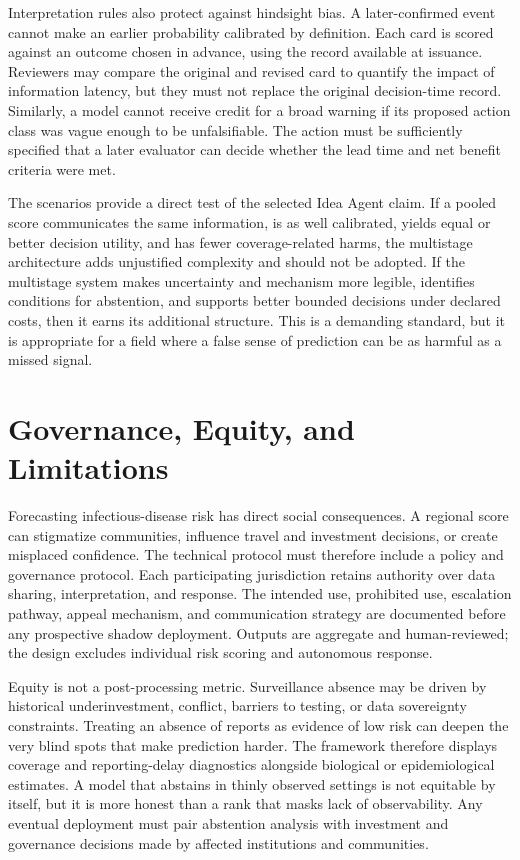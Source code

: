 \documentclass[conference]{IEEEtran}
\begin{document}
Interpretation rules also protect against hindsight bias. A later-confirmed event cannot make an earlier probability calibrated by definition. Each card is scored against an outcome chosen in advance, using the record available at issuance. Reviewers may compare the original and revised card to quantify the impact of information latency, but they must not replace the original decision-time record. Similarly, a model cannot receive credit for a broad warning if its proposed action class was vague enough to be unfalsifiable. The action must be sufficiently specified that a later evaluator can decide whether the lead time and net benefit criteria were met.

The scenarios provide a direct test of the selected Idea Agent claim. If a pooled score communicates the same information, is as well calibrated, yields equal or better decision utility, and has fewer coverage-related harms, the multistage architecture adds unjustified complexity and should not be adopted. If the multistage system makes uncertainty and mechanism more legible, identifies conditions for abstention, and supports better bounded decisions under declared costs, then it earns its additional structure. This is a demanding standard, but it is appropriate for a field where a false sense of prediction can be as harmful as a missed signal.

\section{Governance, Equity, and Limitations}

Forecasting infectious-disease risk has direct social consequences. A regional score can stigmatize communities, influence travel and investment decisions, or create misplaced confidence. The technical protocol must therefore include a policy and governance protocol. Each participating jurisdiction retains authority over data sharing, interpretation, and response. The intended use, prohibited use, escalation pathway, appeal mechanism, and communication strategy are documented before any prospective shadow deployment. Outputs are aggregate and human-reviewed; the design excludes individual risk scoring and autonomous response.

Equity is not a post-processing metric. Surveillance absence may be driven by historical underinvestment, conflict, barriers to testing, or data sovereignty constraints. Treating an absence of reports as evidence of low risk can deepen the very blind spots that make prediction harder. The framework therefore displays coverage and reporting-delay diagnostics alongside biological or epidemiological estimates. A model that abstains in thinly observed settings is not equitable by itself, but it is more honest than a rank that masks lack of observability. Any eventual deployment must pair abstention analysis with investment and governance decisions made by affected institutions and communities.
\end{document}
